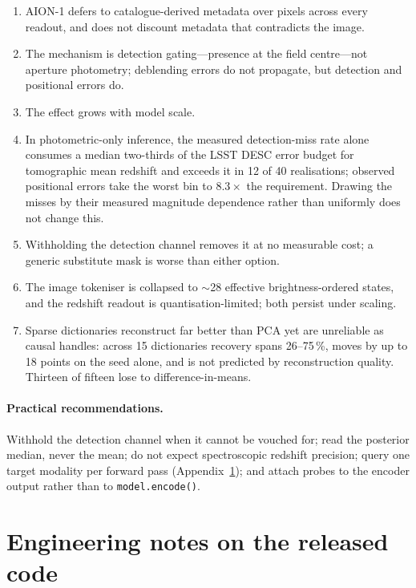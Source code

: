 \documentclass[11pt]{article}
\newcommand{\aion}{AION-1}
\begin{document}
\begin{enumerate}\itemsep2pt
\item \aion{} defers to catalogue-derived metadata over pixels across every readout, and does
not discount metadata that contradicts the image.
\item The mechanism is detection gating---presence at the field centre---not aperture
photometry; deblending errors do not propagate, but detection and positional errors do.
\item The effect grows with model scale.
\item In photometric-only inference, the measured detection-miss rate alone consumes a median
two-thirds of the LSST DESC error budget for tomographic mean redshift and exceeds it in 12 of
40 realisations; observed positional errors take the worst bin to $8.3\times$ the requirement.
Drawing the misses by their measured magnitude dependence rather than uniformly does not change
this.
\item Withholding the detection channel removes it at no measurable cost; a generic substitute
mask is worse than either option.
\item The image tokeniser is collapsed to $\sim$28 effective brightness-ordered states, and the
redshift readout is quantisation-limited; both persist under scaling.
\item Sparse dictionaries reconstruct far better than PCA yet are unreliable as causal
handles: across 15 dictionaries recovery spans 26--75\,\%, moves by up to 18 points on the seed
alone, and is not predicted by reconstruction quality. Thirteen of fifteen lose to
difference-in-means.
\end{enumerate}

\paragraph{Practical recommendations.} Withhold the detection channel when it cannot be vouched
for; read the posterior median, never the mean; do not expect spectroscopic redshift precision;
query one target modality per forward pass (Appendix~\ref{app:bugs}); and attach probes to the
encoder output rather than to \texttt{model.encode()}.

\appendix

\section{Engineering notes on the released code}
\label{app:bugs}
\end{document}
